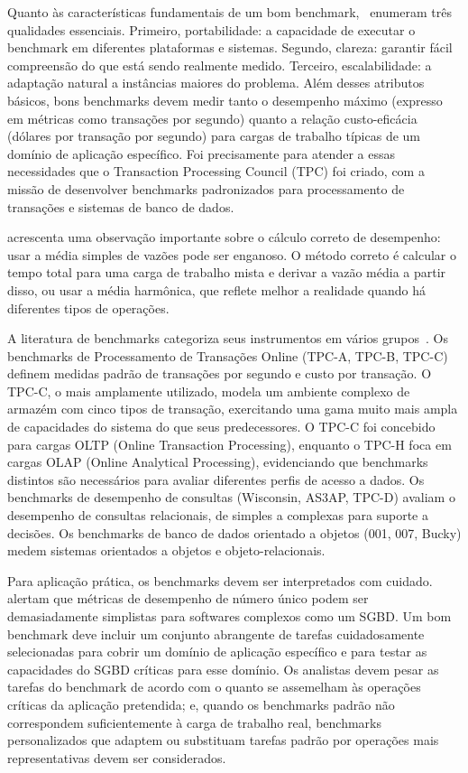 Quanto às características fundamentais de um bom benchmark,~\cite{Ramakrishnan2003} enumeram
três qualidades essenciais. Primeiro, portabilidade: a capacidade de executar o
benchmark em diferentes plataformas e sistemas. Segundo, clareza: garantir fácil
compreensão do que está sendo realmente medido. Terceiro, escalabilidade: a adaptação
natural a instâncias maiores do problema. Além desses atributos básicos, bons benchmarks devem
medir tanto o desempenho máximo (expresso em métricas como transações por segundo) quanto a
relação custo-eficácia (dólares por transação por segundo) para cargas de trabalho típicas de
um domínio de aplicação específico. Foi precisamente para atender a essas necessidades que o
Transaction Processing Council (TPC) foi criado, com a missão de desenvolver benchmarks
padronizados para processamento de transações e sistemas de banco de dados.

\cite{silberschatz2020} acrescenta uma observação importante sobre o cálculo correto de
desempenho: usar a média simples de vazões pode ser enganoso. O método correto é calcular o
tempo total para uma carga de trabalho mista e derivar a vazão média a partir disso, ou usar a
média harmônica, que reflete melhor a realidade quando há diferentes tipos de operações.

A literatura de benchmarks categoriza seus instrumentos em vários grupos~\citep{Ramakrishnan2003}.
Os benchmarks de Processamento de Transações Online (TPC-A, TPC-B, TPC-C) definem
medidas padrão de transações por segundo e custo por transação. O TPC-C, o mais amplamente
utilizado, modela um ambiente complexo de armazém com cinco tipos de transação, exercitando uma
gama muito mais ampla de capacidades do sistema do que seus predecessores. O TPC-C foi concebido
para cargas OLTP (Online Transaction Processing), enquanto o TPC-H foca em cargas OLAP (Online
Analytical Processing), evidenciando que benchmarks distintos são necessários para avaliar
diferentes perfis de acesso a dados. Os benchmarks de
desempenho de consultas (Wisconsin, AS3AP, TPC-D) avaliam o desempenho de consultas
relacionais, de simples a complexas para suporte a decisões. Os benchmarks de banco de
dados orientado a objetos (001, 007, Bucky) medem sistemas orientados a objetos e
objeto-relacionais.

Para aplicação prática, os benchmarks devem ser interpretados com cuidado.
\cite{Ramakrishnan2003} alertam que métricas de desempenho de número único podem ser
demasiadamente simplistas para softwares complexos como um SGBD. Um bom benchmark deve incluir
um conjunto abrangente de tarefas cuidadosamente selecionadas para cobrir um domínio de
aplicação específico e para testar as capacidades do SGBD críticas para esse domínio. Os
analistas devem pesar as tarefas do benchmark de acordo com o quanto se assemelham às operações
críticas da aplicação pretendida; e, quando os benchmarks padrão não correspondem
suficientemente à carga de trabalho real, benchmarks personalizados que adaptem ou substituam
tarefas padrão por operações mais representativas devem ser considerados.

